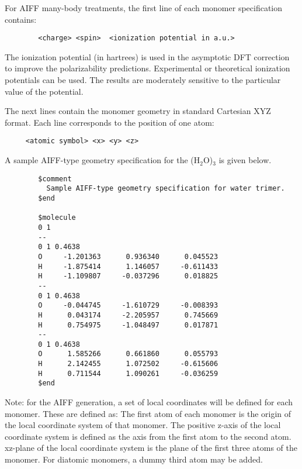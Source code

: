 \documentclass[11pt,letterpaper]{article}
\begin{document}
\begin{spacing}{1.0}
For AIFF many-body treatments, the first line of each monomer
specification contains:
\begin{verbatim}
        <charge> <spin>  <ionization potential in a.u.>
\end{verbatim}
The ionization potential (in hartrees) is used in the asymptotic DFT
correction to improve the polarizability predictions.  Experimental or
theoretical ionization potentials can be used.  The results are
moderately sensitive to the particular value of the potential.

The next lines contain the monomer geometry in standard Cartesian XYZ
format.  Each line corresponds to the position of one atom:
\begin{verbatim}
     <atomic symbol> <x> <y> <z>
\end{verbatim}
A sample AIFF-type geometry specification for the (H$_2$O)$_3$ is given below.
\vspace{5mm}
\hrulefill
\begin{verbatim}
        $comment
          Sample AIFF-type geometry specification for water trimer.
        $end

        $molecule
        0 1
        --
        0 1 0.4638
        O     -1.201363      0.936340      0.045523
        H     -1.875414      1.146057     -0.611433
        H     -1.109807     -0.037296      0.018825
        --
        0 1 0.4638
        O     -0.044745     -1.610729     -0.008393 
        H      0.043174     -2.205957      0.745669 
        H      0.754975     -1.048497      0.017871 
        --
        0 1 0.4638
        O      1.585266      0.661860      0.055793 
        H      2.142455      1.072502     -0.615606 
        H      0.711544      1.090261     -0.036259 
        $end
\end{verbatim}
\hrulefill
\vspace{5mm}

Note: for the AIFF generation, a set of local coordinates will be
defined for each monomer.  These are defined as: The first atom of
each monomer is the origin of the local coordinate system of that
monomer. The positive z-axis of the local coordinate system is defined
as the axis from the first atom to the second atom. xz-plane of the
local coordinate system is the plane of the first three atoms of the
monomer. For diatomic monomers, a dummy third atom may be added.




\end{spacing}
\end{document}

